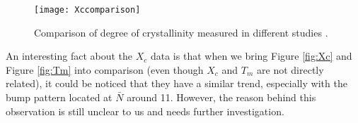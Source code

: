 \begin{figure}[H]
	\center
	\vspace{1 cm}
	\texttt{[image: Xccomparison]}
	\caption[Comparison of degree of crystallinity measured in different studies]{Comparison of degree of crystallinity measured in different studies \cite{Majumdar2010}\cite{Marshall1981}.}
	\label{fig:Xc comparison}
\end{figure}

An interesting fact about the $X_{c}$ data is that when we bring Figure \ref{fig:Xc} and Figure \ref{fig:Tm} into comparison (even though $X_{c}$ and $T_{m}$ are not directly related), it could be noticed that they have a similar trend, especially with the bump pattern located at $\bar{N}$ around 11. However, the reason behind this observation is still unclear to us and needs further investigation.